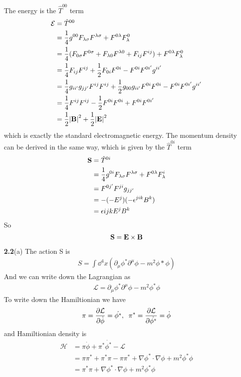 \documentclass{article}
\begin{document}
The energy is the $\hat{T}^{00}$ term
\begin{align*}
  \mathcal{E}&=\hat{T}^{00}\\
  &=\frac{1}{4}g^{00}F_{\lambda\sigma}F^{\lambda\sigma}+F^{0\lambda}F_{\lambda}^{0}\\
  &=\frac{1}{4}(F_{0\sigma}F^{0\sigma}+F_{\lambda0}F^{\lambda0}+F_{ij}F^{ij})+F^{0\lambda}F^0_{\lambda}\\
  &=\frac{1}{4}F_{ij}F^{ij}+\frac{1}{2}F_{0i}F^{0i}-F^{0i}F^{0i'}g^{ii'}\\
  &=\frac{1}{4}g_{ii'}g_{jj'}F^{ij}F^{ij}+\frac{1}{2}g_{00}g_{ii'}F^{0i}F^{0i}-F^{0i}F^{0i'}g^{ii'}\\
  &=\frac{1}{4}F^{ij}F^{ij}-\frac{1}{2}F^{0i}F^{0i}+F^{0i}F^{0i'}\\
  &=\frac{1}{2}\abs{\vb{B}}^2+\frac{1}{2}\abs{\vb{E}}^2\\
\end{align*}
which is exactly the standard electromagnetic energy. The momentum density can be derived in the same way, which is given by the $\hat{T}^{0i}$ term
\begin{align*}
   \vb{S}&=\hat{T}^{0i}\\
   &=\frac{1}{4}g^{0i}F_{\lambda\sigma}F^{\lambda\sigma}+F^{0\lambda}F_{\lambda}^{i}\\
   &=F^{0j'}F^{ji}g_{jj'}\\
   &=-(-E^j)(-\epsilon^{jik}B^k)\\
   &=\epsilon{ijk}E^jB^k
\end{align*}
So
\begin{align}
  \vb{S}=\vb{E}\times\vb{B}
\end{align}
{\bf2.2}\quad(a) The action S is
\begin{align}
S=\int\dd^4x (\partial_{\mu}\phi^*\partial^{\mu}\phi-m^2\phi*\phi)
\end{align}
And we can write down the Lagrangian as
\begin{align}
\mathcal{L}=\partial_{\mu}\phi^*\partial^{\mu}\phi-m^2\phi^*\phi
\end{align}
To write down the Hamiltionian we have
\begin{align}
  \pi=\pdv{\mathcal{L}}{\dot{\phi}}=\dot{\phi^*}, \;\;\pi^* =\pdv{\mathcal{L}}{\dot{\phi^*}}=\dot{\phi}
\end{align}
and Hamiltionian density is
\begin{align}
  \nonumber\mathcal{H}&=\pi\dot{\phi}+\pi^*\dot{\phi^*}-\mathcal{L}\\
  \nonumber&=\pi\pi^*+\pi^*\pi-\pi\pi^*+\nabla{\phi^*}\cdot\nabla{\phi}+m^2\phi^*\phi\\
  &=\pi^*\pi+\nabla{\phi^*}\cdot\nabla{\phi}+m^2\phi^*\phi
\end{align}
\end{document}
